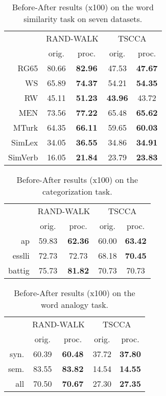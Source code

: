\documentclass{article} \usepackage{acl2017,times}
\begin{document}
\begin{table}[!h]
\centering
\begin{tabular}{|r||c|c||c|c|}
\hline
\multirow{2}{*}{} & \multicolumn{2}{c||}{RAND-WALK} & \multicolumn{2}{c|}{TSCCA} \\ \cline{2-5} 
                  & orig.      & proc.     & orig.    & proc.    \\ \hline
RG65  &     80.66 &     \bf  82.96 &   47.53 &   \bf 47.67       \\ \hline
WS    &     65.89 &     \bf  74.37 &   54.21  &  \bf 54.35 \\ \hline
RW    &     45.11 &     \bf 51.23 &  \bf 43.96   & 43.72   \\ \hline
MEN   &     73.56 &     \bf 77.22 &  65.48   &  \bf65.62     \\ \hline
MTurk &     64.35 &     \bf 66.11 &  59.65  &   \bf 60.03\\ \hline
SimLex  &   34.05 &   \bf 36.55   &   34.86 & \bf 34.91      \\ \hline
SimVerb &   16.05 &  \bf 21.84   &  23.79   &  \bf 23.83     \\ \hline
\end{tabular}
\caption{Before-After results (x100) on the word similarity task on seven datasets.}
\label{tb:similarity-other}
\end{table}

\begin{table}[!h]
\centering
\begin{tabular}{|r||c|c||c|c|}
\hline
\multirow{2}{*}{} & \multicolumn{2}{c||}{RAND-WALK} & \multicolumn{2}{c|}{TSCCA} \\ \cline{2-5} 
                  & orig.      & proc.     & orig.    & proc.    \\ \hline
ap     &     59.83 &    \bf  62.36 &  60.00 & {\bf 63.42}    \\ \hline
esslli &     72.73 &     72.73  &     68.18 & \bf 70.45\\ \hline
battig &     75.73 &    \bf  81.82 &  70.73 & 70.73      \\ \hline
\end{tabular}
\caption{Before-After results (x100) on the categorization task.}
\label{tb:categorization-other}
\end{table}

\begin{table}[!h]
\centering
\begin{tabular}{|r||c|c||c|c|}
\hline
\multirow{2}{*}{} & \multicolumn{2}{c||}{RAND-WALK} & \multicolumn{2}{c|}{TSCCA} \\ \cline{2-5} 
                  & orig.      & proc.     & orig.    & proc.    \\ \hline
syn. &     60.39 &      \bf 60.48 &  37.72   & \bf 37.80   \\ \hline
sem. &     83.55 &    \bf  83.82 &   14.54  & \bf 14.55  \\ \hline
all  &     70.50 &    \bf 70.67 &   27.30  & \bf 27.35  \\ \hline
\end{tabular}
\caption{Before-After results (x100) on the word analogy task.}
\label{tb:analogy-other}
\end{table}
\end{document}
